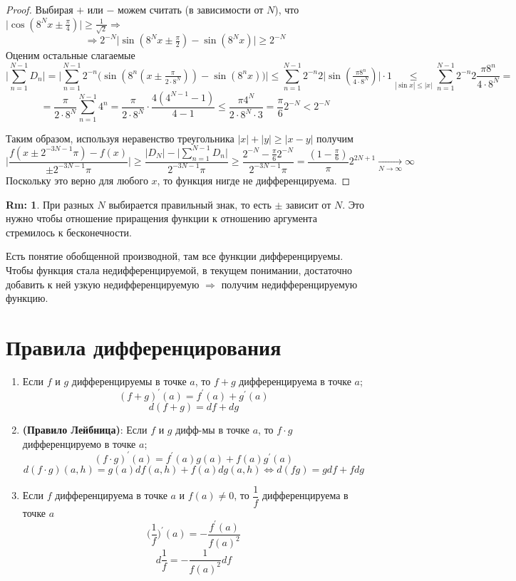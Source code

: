 \documentclass[12pt]{article}
\theoremstyle{definition}
\newtheorem{rem}{Rm:}
\begin{document}
\begin{proof}
	Выбирая $+$ или $-$ можем считать (в зависимости от $N$), что $\Big|\cos(8^Nx \pm \tfrac{\pi}{4})\Big| \geq \tfrac{1}{\sqrt{2}} \Rightarrow$ \\
	$$\Rightarrow2^{-N}\Big|\sin(8^Nx\pm \tfrac{\pi}{2}) - \sin(8^Nx)\Big| \geq 2^{-N}$$
	Оценим остальные слагаемые
	$$\Bigg|\sum\limits_{n=1}^{N-1}D_n\Bigg| = \Bigg|\sum\limits_{n=1}^{N-1}2^{-n}\bigg(\sin(8^n(x\pm \tfrac{\pi}{2{\cdot}8^N})) - \sin(8^nx)   \bigg)\Bigg| \leq \sum\limits_{n=1}^{N-1}2^{-n}2\big|\sin(\tfrac{\pi8^n}{4{\cdot}8^N})\big|{\cdot} 1 \underset{|\sin{x}| \leq |x|}{\leq} \sum\limits_{n=1}^{N-1}2^{-n}2\dfrac{\pi8^n}{4{\cdot}8^N} = $$
	$$=\dfrac{\pi}{2{\cdot}8^N}\sum\limits_{n=1}^{N-1}4^n = \dfrac{\pi}{2{\cdot}8^N}{\cdot}\dfrac{4(4^{N-1}-1)}{4-1} \leq \dfrac{\pi 4^N}{2{\cdot}8^N{\cdot}3}=  \dfrac{\pi}{6}2^{-N} < 2^{-N}$$
	
	Таким образом, используя неравенство треугольника $|x| + |y| \geq |x-y|$ получим
	$$\Bigg|\dfrac{f(x\pm2^{-3N-1}\pi) - f(x)}{\pm2^{-3N-1}\pi}\Bigg|	\geq \dfrac{|D_N| - \Bigg|\sum\limits_{n=1}^{N-1}D_n\Bigg|}{2^{-3N-1}\pi} \geq \dfrac{2^{-N} - \tfrac{\pi}{6}2^{-N}}{2^{-3N-1}\pi} = \dfrac{(1 - \tfrac{\pi}{6})}{\pi} 2^{2N+1} \xrightarrow[N \to \infty]{} \infty$$
	Поскольку это верно для любого $x$, то функция нигде не дифференцируема.
\end{proof}

\begin{rem}
	При разных $N$ выбирается правильный знак, то есть $\pm$ зависит от $N$. Это нужно чтобы отношение приращения функции к отношению аргумента стремилось к бесконечности.
\end{rem}

Есть понятие обобщенной производной, там все функции дифференцируемы. Чтобы функция стала недифференцируемой, в текущем понимании, достаточно добавить к ней узкую недифференцируемую $\Rightarrow$ получим недифференцируемую функцию.

\newpage
\section*{Правила дифференцирования}
\begin{enumerate}[label={\arabic*)}]
	\item Если $f$ и $g$ дифференцируемы в точке $a$, то $f+g$ дифференцируема в точке $a$;
	 $$(f+ g)^\prime(a) = f^\prime(a) + g^\prime(a)$$
	 $$d(f+g) = df + dg$$
	 \item \textbf{(Правило Лейбница)}: Если $f$ и $g$ дифф-мы в точке $a$, то $f{\cdot}g$ дифференцируемо в точке $a$;
	 $$(f{\cdot}g)^\prime(a) = f^\prime(a)g(a) + f(a)g^\prime(a)$$
	 $$d(f{\cdot}g)(a,h) = g(a)df(a,h) + f(a)dg(a,h) \Leftrightarrow d(fg) = gdf + fdg$$
	 \item Если $f$ дифференцируема в точке $a$ и $f(a) \neq 0$, то $\dfrac{1}{f}$ дифференцируема в точке $a$
	 $$\bigg(\dfrac{1}{f}\bigg)^\prime(a) = - \dfrac{f^\prime(a)}{f(a)^2}$$ 
	 $$d \dfrac{1}{f} = -\dfrac{1}{f(a)^2}df$$
\end{enumerate}
\end{document}
